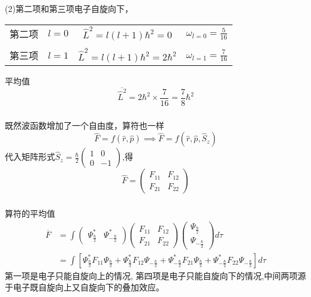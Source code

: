 \begin{frame}[label=current]
  \frametitle{}
(2)第二项和第三项电子自旋向下，
\begin{table}[htbp]
  \centering\begin{tabular}{cccc}
    第二项 & $l= 0$ & $\hat{L}^2 = l(l+1)\hbar^2 = 0$ & $\omega _{l=0} = \frac{5}{16}$ \\
    \\
    第三项 & $l= 1$ & $\hat{L}^2 = l(l+1)\hbar^2 = 2\hbar^2$ & $\omega _{l=1} = \frac{7}{16}$ \\
  \end{tabular}
\end{table}
平均值
$$\overline{\hat{L}^2} =2\hbar^2 \times \frac{7}{16} = \frac{7}{8}\hbar^2$$
\end{frame} 

\begin{frame}[label=current]
  \frametitle{}
  既然波函数增加了一个自由度，算符也一样
  \[ \hat{F} =f (\hat{r},\hat{p}) \implies \hat{F} =f (\hat{r},\hat{p}, \hat{S}_z)  \]
代入矩阵形式$\hat{S}_z = \frac{\hbar}{2} \begin{pmatrix} 1 &  0 \\ 0 & -1 \end{pmatrix}$,得 
\[ \hat{F} = \begin{pmatrix} F_{11} &  F_{12} \\ F_{21} & F_{22} \end{pmatrix}\]
\end{frame} 

\begin{frame}[label=current]
  \frametitle{}
算符的平均值
\[ \begin{aligned}
\overline{F} &= \int \begin{pmatrix} \Psi ^* _\frac{\hbar}{2} &  \Psi^* _{-\frac{\hbar}{2}} \end{pmatrix} \begin{pmatrix} F_{11} &  F_{12} \\ F_{21} & F_{22} \end{pmatrix} \begin{pmatrix} \Psi _\frac{\hbar}{2} \\  \Psi _{-\frac{\hbar}{2}} \end{pmatrix} d \tau \\ 
&= \int \left[ \Psi ^* _\frac{\hbar}{2} F_{11} \Psi _\frac{\hbar}{2}  
+ \Psi ^* _{\frac{\hbar}{2}} F_{12} \Psi _{-\frac{\hbar}{2}} 
+ \Psi ^* _{-\frac{\hbar}{2}} F_{21} \Psi _{\frac{\hbar}{2}} 
+ \Psi ^* _{-\frac{\hbar}{2}} F_{22} \Psi _{-\frac{\hbar}{2}}  \right]d\tau
\end{aligned} 
  \]
第一项是电子只能自旋向上的情况, 第四项是电子只能自旋向下的情况,中间两项源于电子既自旋向上又自旋向下的叠加效应。
\end{frame} 

